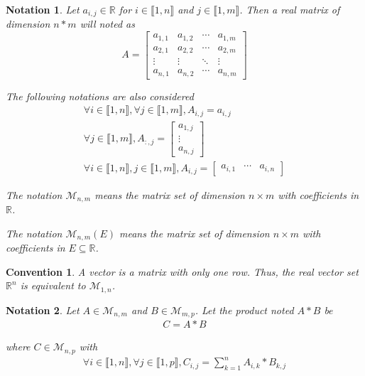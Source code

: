 \documentclass[11pt,en]{elegantpaper}
\newtheorem{convention}{Convention}
\newtheorem{notation}{Notation}
\newcommand{\Real}{\mathbb{R}}
\begin{document}
\begin{notation}
  Let $a_{i,j} \in \Real$ for $i \in \llbracket 1,n \rrbracket$ and $j \in \llbracket 1,m \rrbracket$.
  Then a real matrix of dimension $n * m$ will noted as \begin{equation*}
    A = \begin{bmatrix}
      a_{1,1} & a_{1,2} & \cdots & a_{1,m} \\
      a_{2,1} & a_{2,2} & \cdots & a_{2,m} \\
      \vdots & \vdots & \ddots & \vdots \\
      a_{n,1} & a_{n,2} & \cdots & a_{n,m}
    \end{bmatrix}
  \end{equation*}

  The following notations are also considered \begin{gather*}
    \forall i \in \llbracket 1,n \rrbracket, \forall j \in \llbracket 1,m \rrbracket, A_{i,j} = a_{i,j} \\
    \forall j \in \llbracket 1,m \rrbracket, A_{:,j} = \begin{bmatrix}
      a_{1,j} \\
      \vdots \\
      a_{n,j}
    \end{bmatrix} \\
    \forall i \in \llbracket 1,n \rrbracket, j \in \llbracket 1,m \rrbracket, A_{i,j} = \begin{bmatrix}
      a_{i,1} & \cdots & a_{i,n}
    \end{bmatrix}
  \end{gather*}

  The notation $\mathcal{M}_{n,m}$ means the matrix set of dimension $n \times m$ with coefficients in $\Real$. \par
  The notation $\mathcal{M}_{n,m}(E)$ means the matrix set of dimension $n \times m$ with coefficients in $E \subseteq \Real$.
\end{notation}

\begin{convention}
  A vector is a matrix with only one row. Thus, the real vector set $\Real^n$ is equivalent to $\mathcal{M}_{1,n}$.
\end{convention}

\begin{notation}
  Let $A \in \mathcal{M}_{n,m}$ and $B \in \mathcal{M}_{m,p}$. Let the product noted $A * B$ be \begin{gather*}
    C = A * B
  \end{gather*} \par
  where $C \in \mathcal{M}_{n,p}$ with \begin{gather*}
    \forall i \in \llbracket 1,n \rrbracket, \forall j \in \llbracket 1,p \rrbracket, C_{i,j} = \sum_{k=1}^n A_{i,k} * B_{k,j}
  \end{gather*}

\end{notation}
\end{document}

